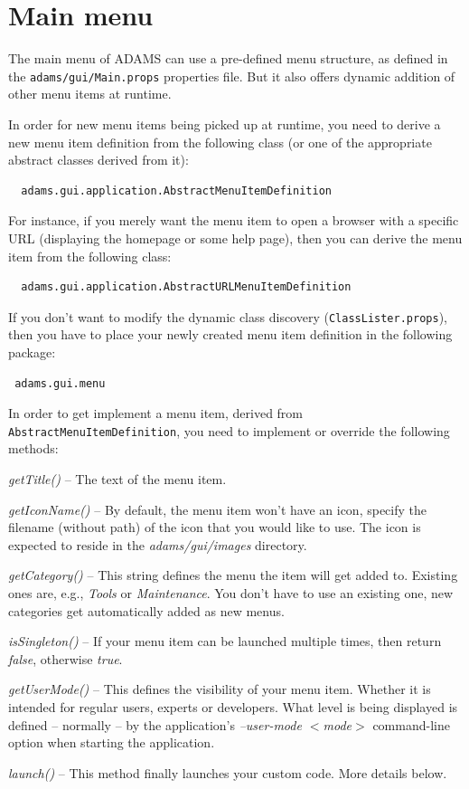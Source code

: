 \section{Main menu}
\label{mainmenu}
The main menu of ADAMS can use a pre-defined menu structure, as defined in the
\texttt{adams/gui/Main.props} properties file. But it also offers dynamic
addition of other menu items at runtime.

In order for new menu items being picked up at runtime, you need to derive a
new menu item definition from the following class (or one of the appropriate
abstract classes derived from it):
\begin{verbatim}
  adams.gui.application.AbstractMenuItemDefinition
\end{verbatim}
For instance, if you merely want the menu item to open a browser with a specific
URL (displaying the homepage or some help page), then you can derive the menu
item from the following class:
\begin{verbatim}
  adams.gui.application.AbstractURLMenuItemDefinition
\end{verbatim}
If you don't want to modify the dynamic class discovery
(\texttt{ClassLister.props}), then you have to place your newly created menu
item definition in the following package:
\begin{verbatim}
 adams.gui.menu
\end{verbatim}
In order to get implement a menu item, derived from
\texttt{AbstractMenuItemDefinition}, you need to implement or override the
following methods:
\begin{tight_itemize}
	\item \textit{getTitle()} -- The text of the menu item.
	\item \textit{getIconName()} -- By default, the menu item won't have an icon,
	specify the filename (without path) of the icon that you would like to use. The
	icon is expected to reside in the \textit{adams/gui/images} directory.
	\item \textit{getCategory()} -- This string defines the menu the item will get
	added to. Existing ones are, e.g., \textit{Tools} or \textit{Maintenance}. You
	don't have to use an existing one, new categories get automatically added as
	new menus.
	\item \textit{isSingleton()} -- If your menu item can be launched multiple
	times, then return \textit{false}, otherwise \textit{true}.
	\item \textit{getUserMode()} -- This defines the visibility of your menu item.
	Whether it is intended for regular users, experts or developers. What level is
	being displayed is defined -- normally -- by the application's
	\textit{--user-mode $<$mode$>$} command-line option when starting the
	application.
	\item \textit{launch()} -- This method finally launches your custom code. More
	details below.
\end{tight_itemize}

